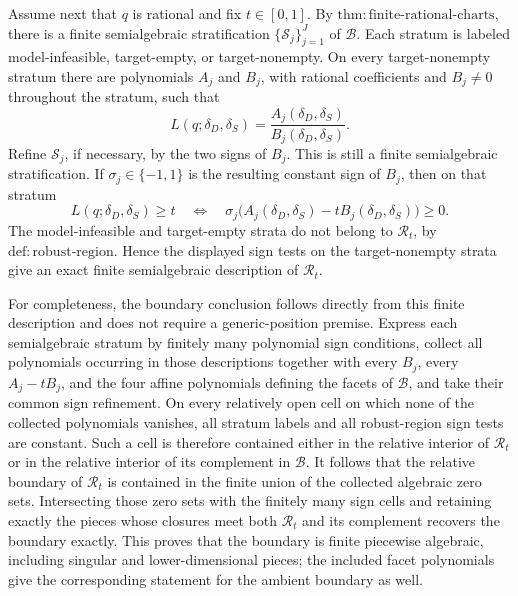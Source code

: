 Assume next that \(q\) is rational and fix \(t\in[0,1]\).  By \(\mathrm{thm:finite\text{-}rational\text{-}charts}\), there is a finite semialgebraic stratification \(\{\mathcal S_j\}_{j=1}^J\) of \(\mathcal B\).  Each stratum is labeled model-infeasible, target-empty, or target-nonempty.  On every target-nonempty stratum there are polynomials \(A_j\) and \(B_j\), with rational coefficients and \(B_j\neq0\) throughout the stratum, such that
\[
 L(q;\delta_D,\delta_S)
 =\frac{A_j(\delta_D,\delta_S)}{B_j(\delta_D,\delta_S)}.
\]
Refine \(\mathcal S_j\), if necessary, by the two signs of \(B_j\).  This is still a finite semialgebraic stratification.  If \(\sigma_j\in\{-1,1\}\) is the resulting constant sign of \(B_j\), then on that stratum
\[
 L(q;\delta_D,\delta_S)\geq t
 \quad\Longleftrightarrow\quad
 \sigma_j\bigl(A_j(\delta_D,\delta_S)-tB_j(\delta_D,\delta_S)\bigr)\geq0.
\]
The model-infeasible and target-empty strata do not belong to \(\mathcal R_t\), by \(\mathrm{def:robust\text{-}region}\).  Hence the displayed sign tests on the target-nonempty strata give an exact finite semialgebraic description of \(\mathcal R_t\).

For completeness, the boundary conclusion follows directly from this finite description and does not require a generic-position premise.  Express each semialgebraic stratum by finitely many polynomial sign conditions, collect all polynomials occurring in those descriptions together with every \(B_j\), every \(A_j-tB_j\), and the four affine polynomials defining the facets of \(\mathcal B\), and take their common sign refinement.  On every relatively open cell on which none of the collected polynomials vanishes, all stratum labels and all robust-region sign tests are constant.  Such a cell is therefore contained either in the relative interior of \(\mathcal R_t\) or in the relative interior of its complement in \(\mathcal B\).  It follows that the relative boundary of \(\mathcal R_t\) is contained in the finite union of the collected algebraic zero sets.  Intersecting those zero sets with the finitely many sign cells and retaining exactly the pieces whose closures meet both \(\mathcal R_t\) and its complement recovers the boundary exactly.  This proves that the boundary is finite piecewise algebraic, including singular and lower-dimensional pieces; the included facet polynomials give the corresponding statement for the ambient boundary as well.

